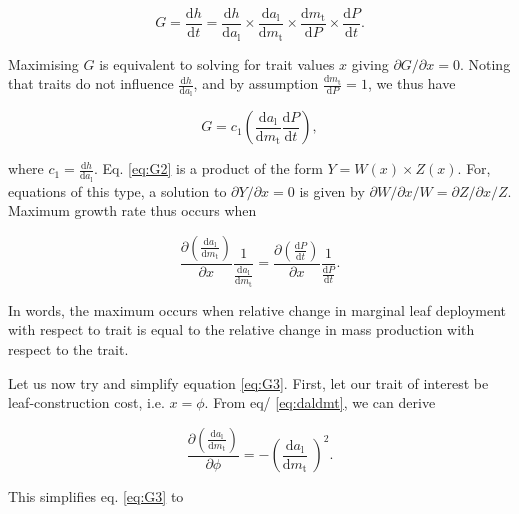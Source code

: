 \documentclass[12pt, a4paper]{article}
\begin{document}
\begin{equation} \label{eq:G1}
G = \frac{\textrm{d}h}{\textrm{d}t} = \frac{\textrm{d}h}{\textrm{d}a_\textrm{l}}
\times \frac{\textrm{d}a_\textrm{l}}{\textrm{d}m_\textrm{t}}
\times \frac{\textrm{d}m_\textrm{t}} {\textrm{d}P}
\times \frac{\textrm{d}P}{\textrm{d}t}.
\end{equation}

Maximising \(G\) is equivalent to solving for trait values \(x\) giving
\(\partial G /\partial x = 0\). Noting that traits do not influence
\(\frac{\textrm{d}h} {\textrm{d}a_\textrm{l}}\), and by assumption
\(\frac{\textrm{d}m_\textrm{t}}{\textrm{d}P}=1\), we thus have

\begin{equation} \label{eq:G2}
G =  c_1   \left(\frac{\textrm{d}a_\textrm{l}} {\textrm{d}m_\textrm{t}}  \frac{ \textrm{d}P} {\textrm{d}t} \right),
\end{equation}

where \(c_1 = \frac{\textrm{d}h}{\textrm{d}a_\textrm{l}}\). Eq.
\ref{eq:G2} is a product of the form \(Y = W(x) \times Z(x)\). For,
equations of this type, a solution to \(\partial{Y}/\partial{x} =0\) is
given by \(\partial{W}/\partial{x} / W = \partial{Z}/\partial{x} / Z\).
Maximum growth rate thus occurs when

\begin{equation} \label{eq:G3}
\frac{\partial \left(\frac{\textrm{d}a_\textrm{l}} {\textrm{d}m_\textrm{t}}\right)}{\partial x} \frac{1}{\frac{\textrm{d}a_\textrm{l}} {\textrm{d}m_\textrm{t}}} = \frac{\partial \left( \frac{ \textrm{d}P} {\textrm{d}t}\right)}{\partial x} \frac{1}{\frac{ \textrm{d}P} {\textrm{d}t} }.
\end{equation}

In words, the maximum occurs when relative change in marginal leaf
deployment with respect to trait is equal to the relative change in mass
production with respect to the trait.

Let us now try and simplify equation \ref{eq:G3}. First, let our trait
of interest be leaf-construction cost, i.e. \(x=\phi\). From eq/
\ref{eq:daldmt}, we can derive

\begin{equation} \label{eq:G4}
\frac{\partial \left(\frac{\textrm{d}a_\textrm{l}} {\textrm{d}m_\textrm{t}}\right)}{\partial \phi} = -\left(\frac{\textrm{d}a_\textrm{l}} {\textrm{d}m_\textrm{t}}\ \right)^2.
\end{equation}

This simplifies eq. \ref{eq:G3} to
\end{document}
